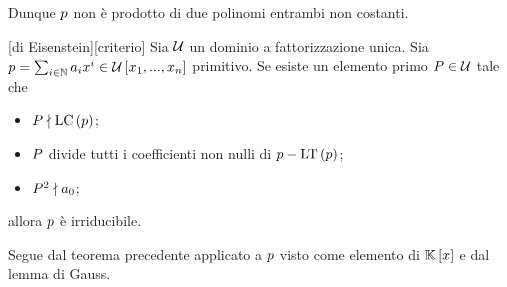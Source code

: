 \par Dunque $p$ non \`e prodotto di due polinomi entrambi non costanti. \EndProof
\begin{Corollary}
	[di Eisenstein][criterio] Sia $\mathcal{U}$ un dominio a fattorizzazione unica. Sia $p = \sum_{i \in \mathbb{N}} a_ix^i \in \mathcal{U} \left [ x_1, ..., x_n \right ]$ primitivo. Se esiste un elemento primo $P \in \mathcal{U}$ tale che
	\begin{itemize}
		\item $P\nmid\text{LC} \left ( p \right )$;
		\item $P$ divide tutti i coefficienti non nulli di $p - \text{LT} \left ( p \right )$;
		\item $P^2\nmid a_0$;
	\end{itemize}
	allora $p$ \`e irriducibile.
\end{Corollary}
\Proof Segue dal teorema precedente applicato a $p$ visto come elemento di $\mathbb{K} \left [ x \right ]$ e dal lemma di Gauss. \EndProof

